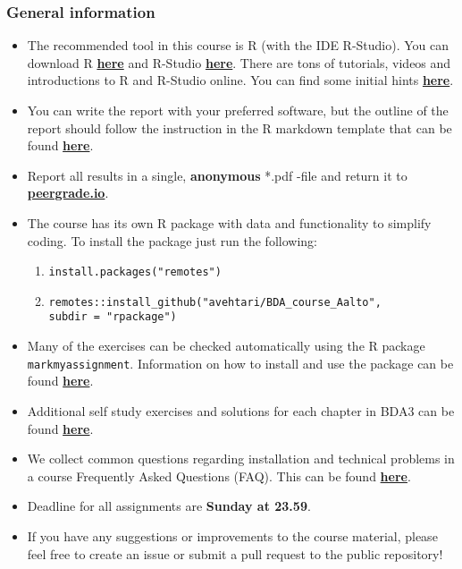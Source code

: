 
\subsubsection*{General information}


\begin{itemize}
\itemsep0em
\item The recommended tool in this course is R (with the IDE R-Studio). You can download R \href{https://cran.r-project.org/}{\textbf{here}} and R-Studio \href{https://www.rstudio.com/products/rstudio/download/}{\textbf{here}}. There are tons of tutorials, videos and introductions to R and R-Studio online. You can find some initial hints \href{https://www.rstudio.com/online-learning/}{\textbf{here}}.
\item  You can write the report with your preferred software, but the outline of the report should follow the instruction in the R markdown template that can be found \href{https://raw.githubusercontent.com/avehtari/BDA_course_Aalto/master/templates/assignment_template.rmd}{\textbf{here}}.
\item  Report all results in a single, {\bf anonymous} *.pdf -file and return it to \href{peergrade.io}{\textbf{peergrade.io}}.
\item The course has its own R package with data and functionality to simplify coding. To install the package just run the following:
\begin{enumerate}
\item \texttt{install.packages("remotes")}
\item \texttt{remotes::install\_github("avehtari/BDA\_course\_Aalto", \\ subdir = "rpackage")}
\end{enumerate}
\item Many of the exercises can be checked automatically using the R package \\ \texttt{markmyassignment}. Information on how to install and use the package can be found \href{https://cran.r-project.org/web/packages/markmyassignment/vignettes/markmyassignment.html}{\textbf{here}}.
\item Additional self study exercises and solutions for each chapter in BDA3 can be found \href{http://www.stat.columbia.edu/~gelman/book/solutions3.pdf}{\textbf{here}}.
\item We collect common questions regarding installation and technical problems in a course Frequently Asked Questions (FAQ). This can be found \href{https://github.com/avehtari/BDA_course_Aalto/blob/master/FAQ.md}{\textbf{here}}.
\item Deadline for all assignments are \textbf{Sunday at 23.59}.
\item If you have any suggestions or improvements to the course material, please feel free to create an issue or submit a pull request to the public repository!
\end{itemize}
